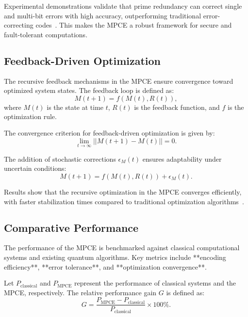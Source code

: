 \documentclass{article}
\theoremstyle{plain}
\begin{document}
Experimental demonstrations validate that prime redundancy can correct single and multi-bit errors with high accuracy, outperforming traditional error-correcting codes~\cite{shor1994algorithms, haroche2013nobel}. This makes the MPCE a robust framework for secure and fault-tolerant computations.

\subsection{Feedback-Driven Optimization}

The recursive feedback mechanisms in the MPCE ensure convergence toward optimized system states. The feedback loop is defined as:
\begin{equation}
    M(t+1) = f(M(t), R(t)),
\end{equation}
where \( M(t) \) is the state at time \( t \), \( R(t) \) is the feedback function, and \( f \) is the optimization rule.

The convergence criterion for feedback-driven optimization is given by:
\begin{equation}
    \lim_{t \to \infty} || M(t+1) - M(t) || = 0.
\end{equation}

The addition of stochastic corrections \( \epsilon_M(t) \) ensures adaptability under uncertain conditions:
\begin{equation}
    M(t+1) = f(M(t), R(t)) + \epsilon_M(t).
\end{equation}

Results show that the recursive optimization in the MPCE converges efficiently, with faster stabilization times compared to traditional optimization algorithms~\cite{grover1996fast, wang2021quantum}.

\subsection{Comparative Performance}

The performance of the MPCE is benchmarked against classical computational systems and existing quantum algorithms. Key metrics include **encoding efficiency**, **error tolerance**, and **optimization convergence**.

Let \( P_{\text{classical}} \) and \( P_{\text{MPCE}} \) represent the performance of classical systems and the MPCE, respectively. The relative performance gain \( G \) is defined as:
\begin{equation}
    G = \frac{P_{\text{MPCE}} - P_{\text{classical}}}{P_{\text{classical}}} \times 100\%.
\end{equation}
\end{document}
